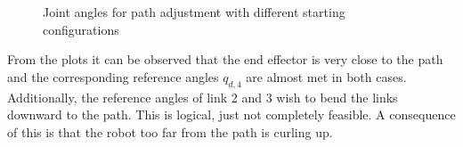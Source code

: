\begin{figure}[H]
    \centering
    


    \caption{Joint angles for path adjustment with different starting configurations}
    \label{fig:case1-2-plot}
\end{figure}

From the plots it can be observed that the end effector is very close to the path and the corresponding reference angles $q_{d,4}$ are almost met in both cases. Additionally, the reference angles of link 2 and 3 wish to bend the links downward to the path. This is logical, just not completely feasible. A consequence of this is that the robot too far from the path is curling up. 



